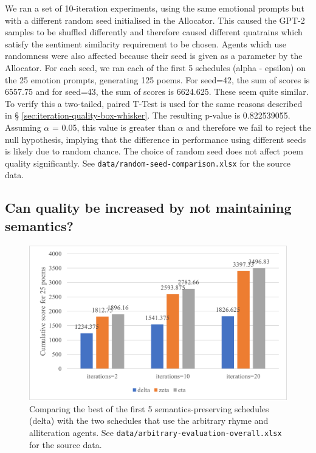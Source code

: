 \documentclass[a4paper,10pt]{article}
\begin{document}
We ran a set of 10-iteration experiments, using the same emotional prompts but with a different random seed initialised in the Allocator. This caused the GPT-2 samples to be shuffled differently and therefore caused different quatrains which satisfy the sentiment similarity requirement to be chosen. Agents which use randomness were also affected because their seed is given as a parameter by the Allocator. For each seed, we ran each of the first 5 schedules (alpha - epsilon) on the 25 emotion prompts, generating 125 poems. For seed=42, the sum of scores is 6557.75 and for seed=43, the sum of scores is 6624.625. These seem quite similar. To verify this a two-tailed, paired T-Test is used for the same reasons described in § \ref{sec:iteration-quality-box-whisker}. The resulting p-value is 0.822539055. Assuming $\alpha$ = 0.05, this value is greater than $\alpha$ and therefore we fail to reject the null hypothesis, implying that the difference in performance using different seeds is likely due to random chance. The choice of random seed does not affect poem quality significantly. See \texttt{data/random-seed-comparison.xlsx} for the source data.

\subsection{Can quality be increased by not maintaining semantics?}

\begin{figure}[htb!]
\centering
\includegraphics[width=1\textwidth]{media/arbitrary-evaluation-overall.png}
\caption{Comparing the best of the first 5 semantics-preserving schedules (delta) with the two schedules that use the arbitrary rhyme and alliteration agents. See \texttt{data/arbitrary-evaluation-overall.xlsx} for the source data.}
\label{fig:arbitrary-evaluation}
\end{figure}
\end{document}
